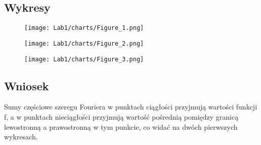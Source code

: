 \begin{Shaded}
\begin{Highlighting}[]
\OperatorTok{=} \NormalTok{\{} \NormalTok{: [fab1()], } \NormalTok{: [fab2()], } \NormalTok{: [fab3()]\}}
\OperatorTok{=} \NormalTok{[fun()]}
\OperatorTok{=} \NormalTok{[]}
\OperatorTok{=} \NormalTok{[]}
  \NormalTok{(}\NormalTok{):}
    \OperatorTok{=}\NormalTok{))}
    \OperatorTok{-} 
\OperatorTok{=} 
\OperatorTok{=} 
  
    \OperatorTok{=} 
    \OperatorTok{=} 
    \OperatorTok{=} 
    \OperatorTok{=} 
    \OperatorTok{=} 
    \OperatorTok{=} \NormalTok{v[}\NormalTok{][}\NormalTok{], v[}\NormalTok{][}\NormalTok{]}
    \OperatorTok{=} 
    \OperatorTok{=} 
      \NormalTok{(}\NormalTok{):}
        \OperatorTok{=} 
        \OperatorTok{+=} 
    \OperatorTok{+=} \OperatorTok{/}
    \NormalTok{plotSeries(x,S, fx[}\NormalTok{][inx])}
\end{Highlighting}
\end{Shaded}
\subsection{Wykresy}
\FloatBarrier
\begin{figure}[!ht]
	\begin{center}
\texttt{[image: Lab1/charts/Figure\_1.png]}
	\end{center}
\end{figure}
\begin{figure}[!ht]
	\begin{center}
\texttt{[image: Lab1/charts/Figure\_2.png]}
	\end{center}
\end{figure}
\begin{figure}[!ht]
	\begin{center}
\texttt{[image: Lab1/charts/Figure\_3.png]}
	\end{center}
\end{figure}
\FloatBarrier

\subsection{Wniosek}
Sumy częściowe szeregu Fouriera w punktach ciągłości przyjmują wartości funkcji f, a w punktach nieciągłości przyjmują wartość pośrednią pomiędzy granicą lewostronną a prawostronną w tym punkcie, co widać na dwóch pierwszych wykresach.
